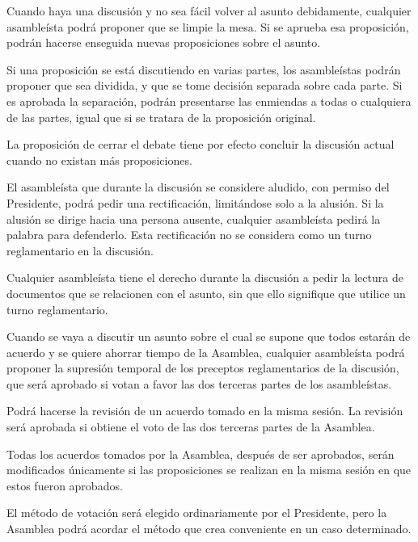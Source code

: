 \article
Cuando haya una discusión y no sea fácil volver al asunto debidamente, cualquier asambleísta podrá proponer que se limpie la mesa. Si se aprueba esa proposición, podrán hacerse enseguida nuevas proposiciones sobre el asunto.

\article
Si una proposición se está discutiendo en varias partes, los asambleístas podrán proponer que sea dividida, y que se tome decisión separada sobre cada parte. Si es aprobada la separación, podrán presentarse las enmiendas a todas o cualquiera de las partes, igual que si se tratara de la proposición original.

\article
La proposición de cerrar el debate tiene por efecto concluir la discusión actual cuando no existan más proposiciones.


\article
El asambleísta que durante la discusión se considere aludido, con permiso del Presidente, podrá pedir una rectificación, limitándose solo a la alusión. Si la alusión se dirige hacia una persona ausente, cualquier asambleísta pedirá la palabra para defenderlo. Esta rectificación no se considera como un turno reglamentario en la discusión.

\article
Cualquier asambleísta tiene el derecho durante la discusión a pedir la lectura de documentos que se relacionen con el asunto, sin que ello signifique que utilice un turno reglamentario.

\article
Cuando se vaya a discutir un asunto sobre el cual se supone que todos estarán de acuerdo y se quiere ahorrar tiempo de la Asamblea, cualquier asambleísta podrá proponer la supresión temporal de los preceptos reglamentarios de la discusión, que será aprobado si votan a favor las dos terceras partes de los asambleístas.

\article
Podrá hacerse la revisión de un acuerdo tomado en la misma sesión. La revisión será aprobada si obtiene el voto de las dos terceras partes de la Asamblea.

\article
Todas los acuerdos tomados por la Asamblea, después de ser aprobados, serán modificados únicamente si las proposiciones se realizan en la misma sesión en que estos fueron aprobados.


\article
\label{votaciones-inicio}
El método de votación será elegido ordinariamente por el Presidente, pero la Asamblea podrá acordar el método que crea conveniente en un caso determinado.

